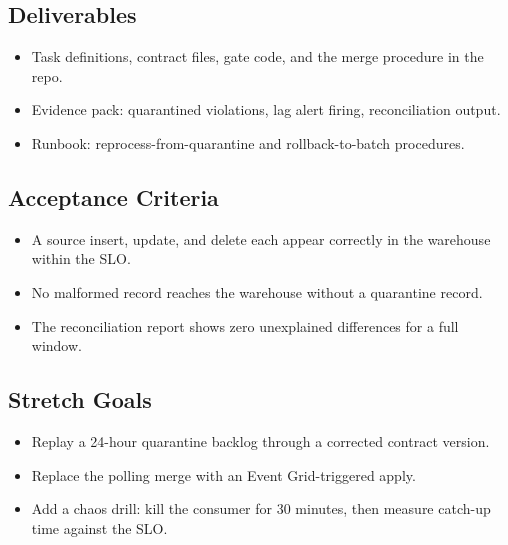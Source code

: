 \subsection*{Deliverables}
\begin{itemize}
    \item Task definitions, contract files, gate code, and the merge procedure in the repo.
    \item Evidence pack: quarantined violations, lag alert firing, reconciliation output.
    \item Runbook: reprocess-from-quarantine and rollback-to-batch procedures.
\end{itemize}

\subsection*{Acceptance Criteria}
\begin{itemize}
    \item A source insert, update, and delete each appear correctly in the warehouse within the SLO.
    \item No malformed record reaches the warehouse without a quarantine record.
    \item The reconciliation report shows zero unexplained differences for a full window.
\end{itemize}

\subsection*{Stretch Goals}
\begin{itemize}
    \item Replay a 24-hour quarantine backlog through a corrected contract version.
    \item Replace the polling merge with an Event Grid-triggered apply.
    \item Add a chaos drill: kill the consumer for 30 minutes, then measure catch-up time against the SLO.
\end{itemize}
